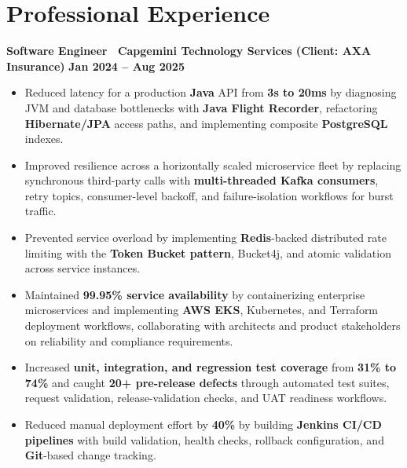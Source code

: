 \documentclass[10pt,letterpaper]{article}
\begin{document}
\section*{Professional Experience}
\textbf{Software Engineer \textbar\ Capgemini Technology Services
(Client: AXA Insurance)}
\hfill \textbf{Jan 2024 -- Aug 2025}
\begin{itemize}
  \item Reduced latency for a production \textbf{Java} API from
  \textbf{3s to 20ms} by diagnosing JVM and database bottlenecks with
  \textbf{Java Flight Recorder}, refactoring \textbf{Hibernate/JPA} access paths,
  and implementing composite \textbf{PostgreSQL} indexes.
  \item Improved resilience across a horizontally scaled microservice fleet
  by replacing synchronous third-party calls with \textbf{multi-threaded Kafka consumers},
  retry topics, consumer-level backoff, and failure-isolation workflows for burst traffic.
  \item Prevented service overload by implementing \textbf{Redis}-backed
  distributed rate limiting with the \textbf{Token Bucket pattern}, Bucket4j,
  and atomic validation across service instances.
  \item Maintained \textbf{99.95\% service availability} by containerizing
  enterprise microservices and implementing \textbf{AWS EKS}, Kubernetes,
  and Terraform deployment workflows, collaborating with architects and
  product stakeholders on reliability and compliance requirements.
  \item Increased \textbf{unit, integration, and regression test coverage}
  from \textbf{31\% to 74\%} and caught \textbf{20+ pre-release defects}
  through automated test suites, request validation, release-validation
  checks, and UAT readiness workflows.
  \item Reduced manual deployment effort by \textbf{40\%} by building
  \textbf{Jenkins CI/CD pipelines} with build validation, health checks,
  rollback configuration, and \textbf{Git}-based change tracking.
\end{itemize}
\vspace{2pt}
\end{document}
